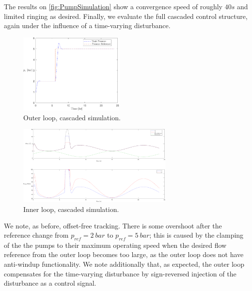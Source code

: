 The results on \cref{fig:PumpSimulation} show a convergence speed of roughly $40 \si{s}$ and limited ringing as desired. Finally, we evaluate the full cascaded control structure, again under the influence of a time-varying disturbance.

\begin{figure}[h!]
	\includegraphics[height=4cm, width=\linewidth]{Graphics/FullSimPressures.pdf}
	\caption{Outer loop, cascaded simulation.}
	\label{fig:FullSimPressure}
\end{figure}

\begin{figure}[h!]
	\includegraphics[height=4cm, width=\linewidth]{Graphics/FullSimFlows.pdf}
	\caption{Inner loop, cascaded simulation.}
	\label{fig:FullSimFlows}
\end{figure}

We note, as before, offset-free tracking. There is some overshoot after the reference change from $p_{ref} = 2 \ \si{bar}$ to $p_{ref} = 5 \ \si{bar}$; this is caused by the clamping of the the pumps to their maximum operating speed when the desired flow reference from the outer loop becomes too large, as the outer loop does not have anti-windup functionality. We note additionally that, as expected, the outer loop compensates for the time-varying disturbance by sign-reversed injection of the disturbance as a control signal.



